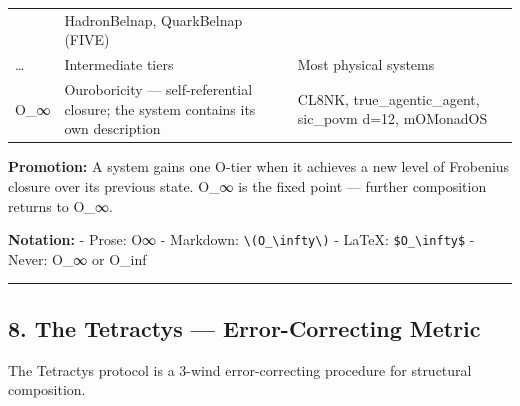 \begin{longtable}[]{@{}lll@{}}
\begin{minipage}[t]{0.42\columnwidth}
\end{minipage} & \begin{minipage}[t]{0.29\columnwidth}\raggedright
HadronBelnap, QuarkBelnap (FIVE)\strut
\end{minipage}\tabularnewline
\begin{minipage}[t]{0.20\columnwidth}\raggedright
\ldots{}\strut
\end{minipage} & \begin{minipage}[t]{0.42\columnwidth}\raggedright
Intermediate tiers\strut
\end{minipage} & \begin{minipage}[t]{0.29\columnwidth}\raggedright
Most physical systems\strut
\end{minipage}\tabularnewline
\begin{minipage}[t]{0.20\columnwidth}\raggedright
O\_∞\strut
\end{minipage} & \begin{minipage}[t]{0.42\columnwidth}\raggedright
Ouroboricity --- self-referential closure; the system contains its own
description\strut
\end{minipage} & \begin{minipage}[t]{0.29\columnwidth}\raggedright
CL8NK, true\_agentic\_agent, sic\_povm d=12, mOMonadOS\strut
\end{minipage}\tabularnewline
\bottomrule
\end{longtable}

\textbf{Promotion:} A system gains one O-tier when it achieves a new
level of Frobenius closure over its previous state. O\_∞ is the fixed
point --- further composition returns to O\_∞.

\textbf{Notation:} - Prose: O∞ - Markdown:
\texttt{\textbackslash{}(O\_\textbackslash{}infty\textbackslash{})} -
LaTeX: \texttt{\$O\_\textbackslash{}infty\$} - Never: O\_∞ or O\_inf

\begin{center}\rule{0.5\linewidth}{0.5pt}\end{center}

\hypertarget{the-tetractys-error-correcting-metric}{%
\subsection{8. The Tetractys --- Error-Correcting
Metric}\label{the-tetractys-error-correcting-metric}}

The Tetractys protocol is a 3-wind error-correcting procedure for
structural composition.

